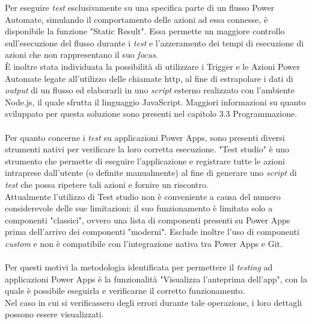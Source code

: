 \newpage \noindent Per eseguire \emph{test} esclusivamente su una specifica parte di un flusso Power Automate, simulando il comportamento delle azioni ad essa connesse, è disponibile la funzione "Static Result". Essa permette un maggiore controllo sull'esecuzione del flusso durante i \emph{test} e l'azzeramento dei tempi di esecuzione di azioni che non rappresentano il suo \emph{focus}.\\
È inoltre stata individuata la possibilità di utilizzare i Trigger e le Azioni Power Automate legate all'utilizzo delle chiamate \gls{http}, al fine di estrapolare i dati di \emph{output} di un flusso ed elaborarli in uno \emph{script} esterno realizzato con l'ambiente Node.js, il quale sfrutta il linguaggio JavaScript. Maggiori informazioni su quanto sviluppato per questa soluzione sono presenti nel capitolo 3.3 Programmazione.\\\\
Per quanto concerne i \emph{test} su applicazioni Power Apps, sono presenti diversi strumenti nativi per verificare la loro corretta esecuzione. "Test studio" è uno strumento che permette di eseguire l'applicazione e registrare tutte le azioni intraprese dall'utente (o definite manualmente) al fine di generare uno \emph{script} di \emph{test} che possa ripetere tali azioni e fornire un riscontro.\\
Attualmente l'utilizzo di Test studio non è conveniente a causa del numero considerevole delle sue limitazioni:
il suo funzionamento è limitato solo a componenti "classici", ovvero una lista di componenti presenti su Power Apps prima dell'arrivo dei componenti "moderni". Esclude inoltre l'uso di componenti \emph{custom} e non è compatibile con l'integrazione nativa tra Power Apps e Git.\\\\    
Per questi motivi la metodologia identificata per permettere il \emph{testing} ad applicazioni Power Apps è la funzionalità "Visualizza l'anteprima dell'app", con la quale è possibile eseguirla e verificarne il corretto funzionamento.\\
Nel caso in cui si verificassero degli errori durante tale operazione, i loro dettagli possono essere visualizzati. 

